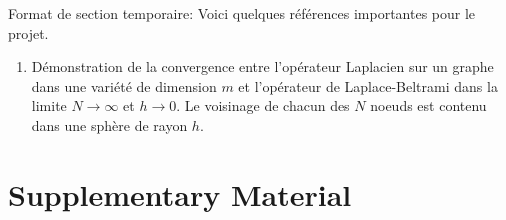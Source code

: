 \documentclass{article}
\begin{document}
Format de section temporaire: Voici quelques références importantes pour le projet.

\begin{enumerate}
    \item {}
    \subitem Démonstration de la convergence entre l'opérateur Laplacien sur un graphe dans une variété de dimension $m$ et l'opérateur de Laplace-Beltrami dans la limite $N\to\infty$ et $h\to0$. Le voisinage de chacun des $N$ noeuds est contenu dans une sphère de rayon $h$.
\end{enumerate}



\newpage

\section*{Supplementary Material}
\end{document}
